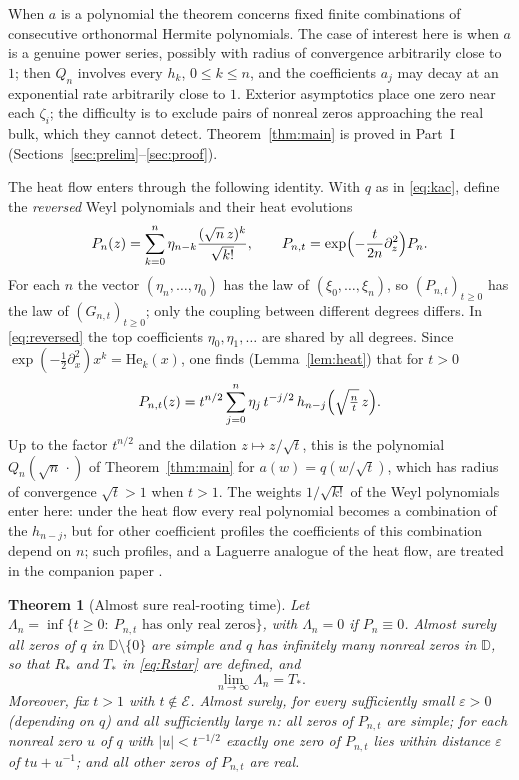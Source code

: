 \documentclass[11pt]{amsart}
\newtheorem{theorem}{Theorem}[section]
\theoremstyle{definition}
\theoremstyle{remark}
\numberwithin{equation}{section}
\newcommand{\D}{\mathbb{D}}
\newcommand{\eps}{\varepsilon}
\newcommand{\He}{\mathrm{He}}
\begin{document}
When $a$ is a polynomial the theorem concerns fixed finite combinations of consecutive orthonormal Hermite polynomials. The case of interest here is when $a$ is a genuine power series, possibly with radius of convergence arbitrarily close to $1$; then $Q_n$ involves every $h_k$, $0\le k\le n$, and the coefficients $a_j$ may decay at an exponential rate arbitrarily close to $1$. Exterior asymptotics place one zero near each $\zeta_i$; the difficulty is to exclude pairs of nonreal zeros approaching the real bulk, which they cannot detect. Theorem~\ref{thm:main} is proved in Part~I (Sections~\ref{sec:prelim}--\ref{sec:proof}).

The heat flow enters through the following identity. With $q$ as in \eqref{eq:kac}, define the \emph{reversed} Weyl polynomials and their heat evolutions
\begin{equation}\label{eq:reversed}
P_n(z)=\sum_{k=0}^{n}\eta_{n-k}\frac{(\sqrt n\,z)^k}{\sqrt{k!}},\qquad P_{n,t}=\exp\Bigl(-\frac{t}{2n}\partial_z^2\Bigr)P_n .
\end{equation}
For each $n$ the vector $(\eta_n,\dots,\eta_0)$ has the law of $(\xi_0,\dots,\xi_n)$, so $(P_{n,t})_{t\ge0}$ has the law of $(G_{n,t})_{t\ge0}$; only the coupling between different degrees differs. In \eqref{eq:reversed} the top coefficients $\eta_0,\eta_1,\dots$ are shared by all degrees. Since $\exp(-\frac12\partial_x^2)x^k=\He_k(x)$, one finds (Lemma~\ref{lem:heat}) that for $t>0$
\begin{equation}\label{eq:heat-hermite}
P_{n,t}(z)=t^{n/2}\sum_{j=0}^{n}\eta_j\,t^{-j/2}\,h_{n-j}\Bigl(\sqrt{\tfrac nt}\,z\Bigr).
\end{equation}
Up to the factor $t^{n/2}$ and the dilation $z\mapsto z/\sqrt t$, this is the polynomial $Q_n(\sqrt n\,\cdot)$ of Theorem~\ref{thm:main} for $a(w)=q(w/\sqrt t)$, which has radius of convergence $\sqrt t>1$ when $t>1$. The weights $1/\sqrt{k!}$ of the Weyl polynomials enter here: under the heat flow every real polynomial becomes a combination of the $h_{n-j}$, but for other coefficient profiles the coefficients of this combination depend on $n$; such profiles, and a Laguerre analogue of the heat flow, are treated in the companion paper \cite{CompC}.

\begin{theorem}[Almost sure real-rooting time]\label{thm:heat}
Let $\Lambda_n=\inf\{t\ge0:\ P_{n,t}\text{ has only real zeros}\}$, with $\Lambda_n=0$ if $P_n\equiv0$. Almost surely all zeros of $q$ in $\D\setminus\{0\}$ are simple and $q$ has infinitely many nonreal zeros in $\D$, so that $R_*$ and $T_*$ in \eqref{eq:Rstar} are defined, and
\[
\lim_{n\to\infty}\Lambda_n=T_* .
\]
Moreover, fix $t>1$ with $t\notin\mathcal E$. Almost surely, for every sufficiently small $\eps>0$ (depending on $q$) and all sufficiently large $n$: all zeros of $P_{n,t}$ are simple; for each nonreal zero $u$ of $q$ with $|u|<t^{-1/2}$ exactly one zero of $P_{n,t}$ lies within distance $\eps$ of $tu+u^{-1}$; and all other zeros of $P_{n,t}$ are real.
\end{theorem}
\end{document}
